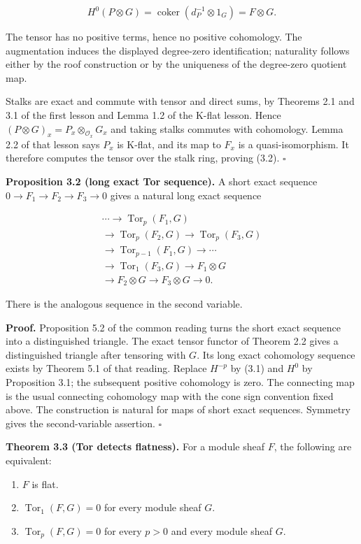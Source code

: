 \documentclass[
  english,
  11pt,
  a4paper,
]{article}
\providecommand{\tightlist}{%
  \setlength{\itemsep}{0pt}\setlength{\parskip}{0pt}}
\begin{document}
\[H^0(P\otimes G)
=\operatorname{coker}(d_P^{-1}\otimes1_G)=F\otimes G.\]

The tensor has no positive terms, hence no positive cohomology. The
augmentation induces the displayed degree-zero identification;
naturality follows either by the roof construction or by the uniqueness
of the degree-zero quotient map.

Stalks are exact and commute with tensor and direct sums, by Theorems
2.1 and 3.1 of the first lesson and Lemma 1.2 of the K-flat lesson.
Hence \((P\otimes G)_x=P_x\otimes_{\mathcal O_x}G_x\) and taking stalks
commutes with cohomology. Lemma 2.2 of that lesson says \(P_x\) is
K-flat, and its map to \(F_x\) is a quasi-isomorphism. It therefore
computes the tensor over the stalk ring, proving (3.2). \(\square\)

\textbf{Proposition 3.2 (long exact Tor sequence).} A short exact
sequence \(0\to F_1\to F_2\to F_3\to0\) gives a natural long exact
sequence

\[\begin{gathered}
\cdots\longrightarrow\operatorname{Tor}_p(F_1,G)\\
\to\operatorname{Tor}_p(F_2,G)
\to\operatorname{Tor}_p(F_3,G)\\
\longrightarrow\operatorname{Tor}_{p-1}(F_1,G)
\longrightarrow\cdots\\
\longrightarrow\operatorname{Tor}_1(F_3,G)
\longrightarrow F_1\otimes G\\
\longrightarrow F_2\otimes G
\longrightarrow F_3\otimes G\longrightarrow0.
\end{gathered}
\tag{3.3}\]

There is the analogous sequence in the second variable.

\textbf{Proof.} Proposition 5.2 of the common reading turns the short
exact sequence into a distinguished triangle. The exact tensor functor
of Theorem 2.2 gives a distinguished triangle after tensoring with
\(G\). Its long exact cohomology sequence exists by Theorem 5.1 of that
reading. Replace \(H^{-p}\) by (3.1) and \(H^0\) by Proposition 3.1; the
subsequent positive cohomology is zero. The connecting map is the usual
connecting cohomology map with the cone sign convention fixed above. The
construction is natural for maps of short exact sequences. Symmetry
gives the second-variable assertion. \(\square\)

\textbf{Theorem 3.3 (Tor detects flatness).} For a module sheaf \(F\),
the following are equivalent:

\begin{enumerate}
\tightlist
\item
  \(F\) is flat.
\item
  \(\operatorname{Tor}_1(F,G)=0\) for every module sheaf \(G\).
\item
  \(\operatorname{Tor}_p(F,G)=0\) for every \(p>0\) and every module
  sheaf \(G\).
\end{enumerate}
\end{document}
